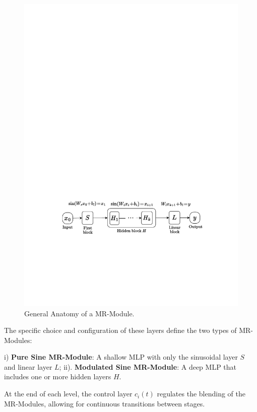 \begin{figure}[!h]
    \centering
    \includegraphics[width=0.9\linewidth]{img/ch4/diagram_mr_module.pdf}
    \caption{General Anatomy of a MR-Module.}
    \label{f:mr-module}
\end{figure}

The specific choice and configuration of these layers define the two types of MR-Modules:

i) \textbf{Pure Sine MR-Module}: A shallow MLP with only the sinusoidal layer \( S \) and linear layer \( L \);
ii). \textbf{Modulated Sine MR-Module}: A deep MLP that includes one or more hidden layers \( H \).

At the end of each level, the control layer \( c_i(t) \) regulates the blending of the MR-Modules, allowing for continuous transitions between stages.


